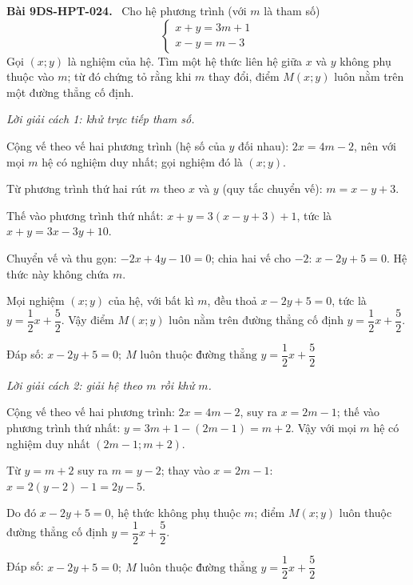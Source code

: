 \documentclass[12pt,a4paper]{article}
\newenvironment{problem}[1][]{\par\medskip\noindent\textbf{Bài #1.}\ }{\par}
\newenvironment{solution}[1][]{\par\noindent\textit{Lời giải #1.}\par}{\par}
\begin{document}
\begin{problem}[9DS-HPT-024]
Cho hệ phương trình (với $m$ là tham số)
\[ \begin{cases} x + y = 3m + 1 \\ x - y = m - 3 \end{cases} \]
Gọi $(x; y)$ là nghiệm của hệ. Tìm một hệ thức liên hệ giữa $x$ và $y$ không phụ thuộc vào $m$; từ đó chứng tỏ rằng khi $m$ thay đổi, điểm $M(x; y)$ luôn nằm trên một đường thẳng cố định.

\begin{solution}[cách 1: khử trực tiếp tham số]
Cộng vế theo vế hai phương trình (hệ số của $y$ đối nhau): $2x = 4m - 2$, nên với mọi $m$ hệ có nghiệm duy nhất; gọi nghiệm đó là $(x; y)$.

Từ phương trình thứ hai rút $m$ theo $x$ và $y$ (quy tắc chuyển vế): $m = x - y + 3$.

Thế vào phương trình thứ nhất: $x + y = 3(x - y + 3) + 1$, tức là $x + y = 3x - 3y + 10$.

Chuyển vế và thu gọn: $-2x + 4y - 10 = 0$; chia hai vế cho $-2$: $x - 2y + 5 = 0$. Hệ thức này không chứa $m$.

Mọi nghiệm $(x; y)$ của hệ, với bất kì $m$, đều thoả $x - 2y + 5 = 0$, tức là $y = \dfrac{1}{2}x + \dfrac{5}{2}$. Vậy điểm $M(x; y)$ luôn nằm trên đường thẳng cố định $y = \dfrac{1}{2}x + \dfrac{5}{2}$.

Đáp số: $\boxed{x - 2y + 5 = 0;\ M \text{ luôn thuộc đường thẳng } y = \dfrac{1}{2}x + \dfrac{5}{2}}$
\end{solution}

\begin{solution}[cách 2: giải hệ theo $m$ rồi khử $m$]
Cộng vế theo vế hai phương trình: $2x = 4m - 2$, suy ra $x = 2m - 1$; thế vào phương trình thứ nhất: $y = 3m + 1 - (2m - 1) = m + 2$. Vậy với mọi $m$ hệ có nghiệm duy nhất $(2m - 1; m + 2)$.

Từ $y = m + 2$ suy ra $m = y - 2$; thay vào $x = 2m - 1$: $x = 2(y - 2) - 1 = 2y - 5$.

Do đó $x - 2y + 5 = 0$, hệ thức không phụ thuộc $m$; điểm $M(x; y)$ luôn thuộc đường thẳng cố định $y = \dfrac{1}{2}x + \dfrac{5}{2}$.

Đáp số: $\boxed{x - 2y + 5 = 0;\ M \text{ luôn thuộc đường thẳng } y = \dfrac{1}{2}x + \dfrac{5}{2}}$
\end{solution}
\end{problem}
\end{document}
